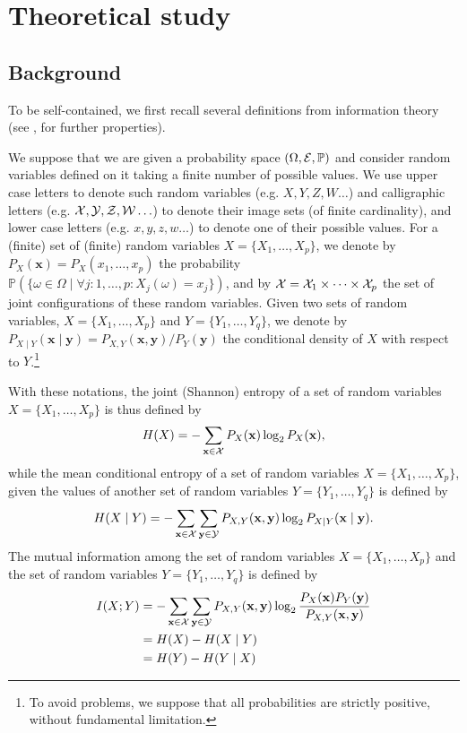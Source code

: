 \section{Theoretical study}
\label{sec:6:theory}

\subsection{Background}

To be self-contained, we first recall several definitions from information
theory (see \citep{cover:2012}, for further properties).

We suppose that we are given a probability space $(\Omega, {\cal E},
\mathbb{P})$ and  consider random variables defined on it taking a finite
number of possible values. We use upper case letters to denote such random
variables (e.g. $X, Y, Z, W \ldots$)  and calligraphic letters (e.g. $\cal X,
Y, Z, W \ldots$) to denote their image sets (of finite cardinality), and lower
case letters (e.g. $x, y, z, w \ldots$) to denote one of their possible values.
For a (finite) set of (finite) random variables $ X = \{X_{1}, \ldots ,
X_{p}\}$, we denote by $P_{X}(\mathbf{x}) = P_{X}(x_{1}, \ldots , x_{p})$ the
probability $\mathbb{P}(\{ \omega \in \Omega \mid  \forall j : 1, \ldots, p:
X_j(\omega) =x_j\})$, and by ${\cal X} = {\cal X}_{1} \times \cdots
\times {\cal X}_{p}$ the set of joint configurations of these random variables.
Given two sets of random variables, $X = \{X_{1}, \ldots , X_{p}\}$ and
$Y=\{Y_{1}, \ldots , Y_{q}\}$, we denote by $P_{X \mid Y}(\mathbf{x} \mid \mathbf{y}) = {P_{X, Y}
(\mathbf{x},  \mathbf{y})}/ {P_{Y}(\mathbf{y})}$ the conditional density of $X$ with respect to
$Y$.\footnote{To avoid problems, we suppose that all probabilities are strictly
positive, without fundamental limitation.}

With these notations, the joint (Shannon) entropy of a set of random variables
$X =\{X_{1}, \ldots , X_{p}\}$ is thus defined by
\begin{equation}
H(X)  = - \sum_{\mathbf{x} \in {\cal X}}P_{X} (\mathbf{x})\log_{2}P_{X}(\mathbf{x}),
\end{equation}
while the mean conditional entropy of a set of random variables $X = \{X_{1},
\ldots , X_{p}\}$, given the values of another set of random variables
$Y=\{Y_{1}, \ldots , Y_{q}\}$ is defined by
\begin{equation}
H(X\mid Y) = - \sum_{\mathbf{x} \in {\cal X}} \sum_{\mathbf{y} \in {\cal Y}} P_{X, Y} (\mathbf{x}, \mathbf{y}) \log_{2} P_{X \mid Y} (\mathbf{x} \mid \mathbf{y}).
 \end{equation}
The mutual information among the set of random variables $X =\{X_{1}, \ldots ,
X_{p}\}$ and the set of random variables $Y=\{Y_{1}, \ldots , Y_{q}\}$ is
defined by
 \begin{align}
 I(X; Y) &= - \sum_{\mathbf{x} \in {\cal X}} \sum_{\mathbf{y} \in {\cal Y}} P_{X, Y} (\mathbf{x}, \mathbf{y}) \log_{2} \frac{P_{X}(\mathbf{x}) P_{Y}(\mathbf{y})}{P_{X,Y}(\mathbf{x},\mathbf{y})} \\
 &= H(X) - H(X \mid Y) \nonumber \\
 &=  H(Y) - H(Y \mid X) \nonumber
 \end{align}

